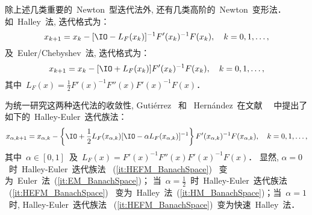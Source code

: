 除上述几类重要的~Newton~型迭代法外, 还有几类高阶的~Newton~变形法．
如~Halley~法, 迭代格式为：
\begin{equation}
\label{it:HM_BanachSpace} x_{k+1} = x_k - [\IO -
L_F(x_k)]^{-1}F'(x_k)^{-1}F(x_k), \quad k=0,1,\ldots,
\end{equation}
及~Euler/Chebyshev~法, 迭代格式为：
\begin{equation}
\label{it:EM_BanachSpace} x_{k+1} = x_k - [\IO +
L_F(x_k)]F'(x_k)^{-1}F(x_k), \quad k=0,1,\ldots,
\end{equation}
其中~$L_F(x)=\frac{1}{2}F'(x)^{-1}F''(x)F'(x)^{-1}F(x)$．



为统一研究这两种迭代法的收敛性, Guti\'{e}rrez~ 和
~Hern\'{a}ndez~在文献
~\cite{Gutierrez1997a}~中提出了如下的~Halley-Euler~迭代族法：
\begin{equation}
\label{it:HEFM_BanachSpace} x_{\alpha,k+1} = x_{\alpha,k} -
\left\{\IO + \frac{1}{2}L_F(x_{\alpha,k})[\IO - \alpha
L_F(x_{\alpha,k})]^{-1}\right\}F'(x_{\alpha,k})^{-1}F(x_{\alpha,k}),
\quad k=0,1,\ldots,
\end{equation}
其中~$\alpha \in [0,1]$~及~$L_F(x) =
F'(x)^{-1}F''(x)F'(x)^{-1}F(x)$． 显然, $\alpha =
0$~时~Halley-Euler~迭代族法 ~(\ref{it:HEFM_BanachSpace})~
变为~Euler~法~(\ref{it:EM_BanachSpace})； 当~$\alpha =
\frac{1}{2}$~时~Halley-Euler~迭代族法 ~(\ref{it:HEFM_BanachSpace})~
变为~Halley~法~(\ref{it:HM_BanachSpace})；当~$\alpha = 1$~时,
Halley-Euler~迭代族法
~(\ref{it:HEFM_BanachSpace})~变为快速~Halley~法．


